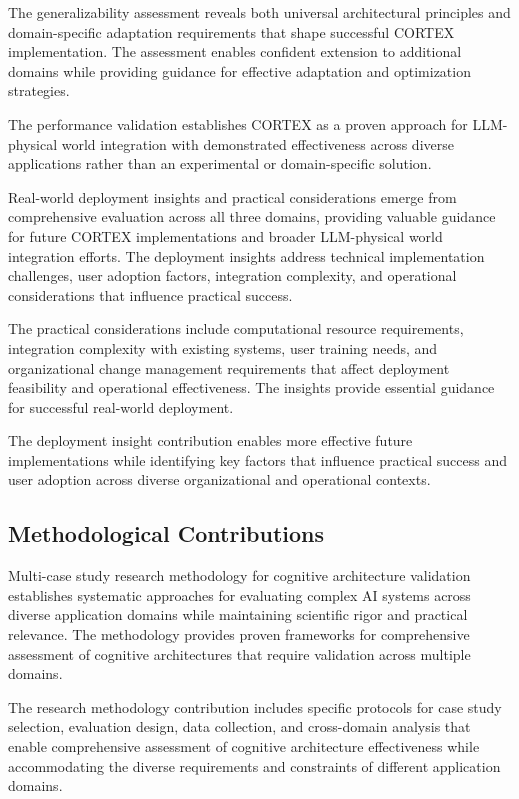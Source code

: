 The generalizability assessment reveals both universal architectural principles and domain-specific adaptation requirements that shape successful CORTEX implementation. The assessment enables confident extension to additional domains while providing guidance for effective adaptation and optimization strategies.

The performance validation establishes CORTEX as a proven approach for LLM-physical world integration with demonstrated effectiveness across diverse applications rather than an experimental or domain-specific solution.

Real-world deployment insights and practical considerations emerge from comprehensive evaluation across all three domains, providing valuable guidance for future CORTEX implementations and broader LLM-physical world integration efforts. The deployment insights address technical implementation challenges, user adoption factors, integration complexity, and operational considerations that influence practical success.

The practical considerations include computational resource requirements, integration complexity with existing systems, user training needs, and organizational change management requirements that affect deployment feasibility and operational effectiveness. The insights provide essential guidance for successful real-world deployment.

The deployment insight contribution enables more effective future implementations while identifying key factors that influence practical success and user adoption across diverse organizational and operational contexts.

\subsection{Methodological Contributions}

Multi-case study research methodology for cognitive architecture validation establishes systematic approaches for evaluating complex AI systems across diverse application domains while maintaining scientific rigor and practical relevance. The methodology provides proven frameworks for comprehensive assessment of cognitive architectures that require validation across multiple domains.

The research methodology contribution includes specific protocols for case study selection, evaluation design, data collection, and cross-domain analysis that enable comprehensive assessment of cognitive architecture effectiveness while accommodating the diverse requirements and constraints of different application domains.

